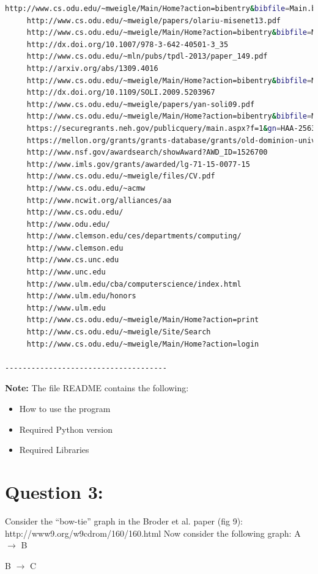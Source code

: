 \documentclass[a4paper, 11pt]{article}
\begin{document}
\begin{lstlisting}[language=bash,label=Output:,caption=Output:]
	 http://www.cs.odu.edu/~mweigle/Main/Home?action=bibentry&bibfile=Main.bibtex&bibref=brunelle-jcdl14
	 http://www.cs.odu.edu/~mweigle/papers/olariu-misenet13.pdf
	 http://www.cs.odu.edu/~mweigle/Main/Home?action=bibentry&bibfile=Main.bibtex&bibref=olariu-misenet13
	 http://dx.doi.org/10.1007/978-3-642-40501-3_35
	 http://www.cs.odu.edu/~mln/pubs/tpdl-2013/paper_149.pdf
	 http://arxiv.org/abs/1309.4016
	 http://www.cs.odu.edu/~mweigle/Main/Home?action=bibentry&bibfile=Main.bibtex&bibref=alnoamany-tpdl13
	 http://dx.doi.org/10.1109/SOLI.2009.5203967
	 http://www.cs.odu.edu/~mweigle/papers/yan-soli09.pdf
	 http://www.cs.odu.edu/~mweigle/Main/Home?action=bibentry&bibfile=Main.bibtex&bibref=yan-soli09
	 https://securegrants.neh.gov/publicquery/main.aspx?f=1&gn=HAA-256368-17
	 https://mellon.org/grants/grants-database/grants/old-dominion-university/11600663/
	 http://www.nsf.gov/awardsearch/showAward?AWD_ID=1526700
	 http://www.imls.gov/grants/awarded/lg-71-15-0077-15
	 http://www.cs.odu.edu/~mweigle/files/CV.pdf
	 http://www.cs.odu.edu/~acmw
	 http://www.ncwit.org/alliances/aa
	 http://www.cs.odu.edu/
	 http://www.odu.edu/
	 http://www.clemson.edu/ces/departments/computing/
	 http://www.clemson.edu
	 http://www.cs.unc.edu
	 http://www.unc.edu
	 http://www.ulm.edu/cba/computerscience/index.html
	 http://www.ulm.edu/honors
	 http://www.ulm.edu
	 http://www.cs.odu.edu/~mweigle/Main/Home?action=print
	 http://www.cs.odu.edu/~mweigle/Site/Search
	 http://www.cs.odu.edu/~mweigle/Main/Home?action=login

-------------------------------------
\end{lstlisting}

\ifx
\newline
\noindent
\textbf{Note:}
The file README contains the following:
\begin{itemize}
\item 
How to use the program
\item 
Required Python version
\item
Required Libraries 
\end{itemize}
\fi
\section*{Question 3:}
Consider the ``bow-tie'' graph in the Broder et al. paper (fig 9):
    http://www9.org/w9cdrom/160/160.html
    Now consider the following graph:
\newline
    A $\longrightarrow$ B
    
    B $\longrightarrow$ C
    
\end{document}
